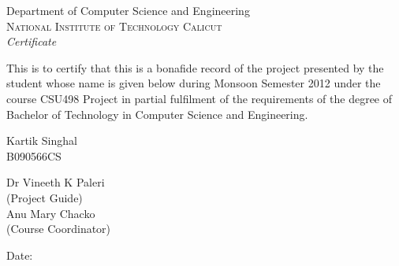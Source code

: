 \newpage
\thispagestyle{empty}

\begin{center}

\huge{Department of Computer Science and Engineering}\\[0.5cm]
\normalsize
\textsc{National Institute of Technology Calicut}\\[2.0cm]

\emph{\LARGE Certificate}\\[2.5cm]
\end{center}
\normalsize This is to certify that this is a bonafide record of the project presented by the student whose name is given below during Monsoon Semester 2012 under the course CSU498 Project in partial fulfilment of the requirements of the degree of Bachelor of Technology in Computer Science and Engineering.\\[0.2in]

\begin{center}
Kartik Singhal \\
B090566CS\\[1.0in]
\end{center}

\vfill


\begin{flushright}
Dr Vineeth K Paleri\\
(Project Guide)\\[1.5cm]
Anu Mary Chacko\\
(Course Coordinator)\\
\end{flushright}

\begin{flushleft}
Date:
\end{flushleft}


